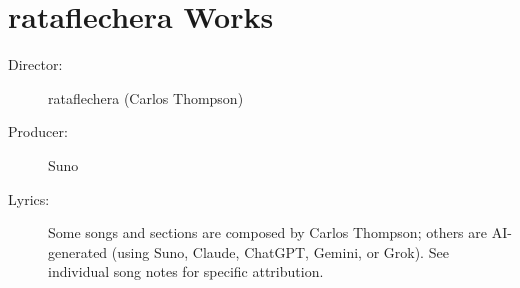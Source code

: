\chapter{rataflechera Works}

\begin{description}
\item[Director:] rataflechera (Carlos Thompson)
\item[Producer:] Suno
\item[Lyrics:] Some songs and sections are composed by Carlos Thompson; others are AI-generated (using Suno, Claude, ChatGPT, Gemini, or Grok). %
See individual song notes for specific attribution.
\end{description}

\sepbar




